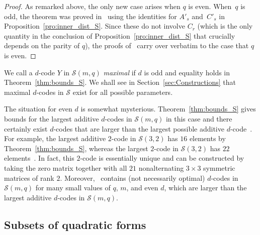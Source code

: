 \documentclass[10pt]{article}
\theoremstyle{definition}
\renewcommand{\S}{\mathscr{S}}
\begin{document}
\begin{proof}
As remarked above, the only new case arises when $q$ is even. When~$q$ is odd, the theorem was proved in~\cite[Lemmas~3.5 and~3.6]{Sch2015} using the identities for $A'_s$ and~$C'_s$ in Proposition~\ref{pro:inner_dist_S}. Since these do not involve $C_r$ (which is the only quantity in the conclusion of Proposition~\ref{pro:inner_dist_S} that crucially depends on the parity of $q$), the proofs of~\cite[Lemmas~3.5 and~3.6]{Sch2015} carry over verbatim to the case that $q$ is even.
\end{proof}
\par
We call a $d$-code $Y$ in $\S(m,q)$ \emph{maximal} if $d$ is odd and equality holds in Theorem~\ref{thm:bounds_S}. We shall see in Section~\ref{sec:Constructions} that maximal $d$-codes in $\S$ exist for all possible parameters. 
\par
The situation for even $d$ is somewhat mysterious. Theorem~\ref{thm:bounds_S} gives bounds for the largest additive $d$-codes in $\S(m,q)$ in this case and there certainly exist $d$-codes that are larger than the largest possible additive $d$-code~\cite{Sch2016}. For example, the largest additive $2$-code in $\S(3,2)$ has $16$ elements by Theorem~\ref{thm:bounds_S}, whereas the largest $2$-code in $\S(3,2)$ has $22$ elements~\cite{Sch2016}. In fact, this $2$-code is essentially unique and can be constructed by taking the zero matrix together with all $21$ nonalternating $3\times 3$ symmetric matrices of rank $2$. Moreover,~\cite{Sch2016} contains (not necessarily optimal) $d$-codes in $\S(m,q)$ for many small values of $q$, $m$, and even $d$, which are larger than the largest additive $d$-codes in $\S(m,q)$.

%

\subsection{Subsets of quadratic forms}
\end{document}
